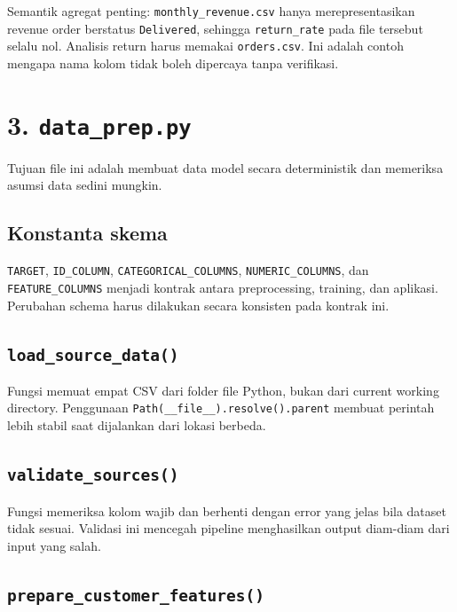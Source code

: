 \documentclass[
  indonesian,
  letterpaper,
  DIV=11,
  numbers=noendperiod]{scrreprt}
\begin{document}
Semantik agregat penting: \texttt{monthly\_revenue.csv} hanya
merepresentasikan revenue order berstatus \texttt{Delivered}, sehingga
\texttt{return\_rate} pada file tersebut selalu nol. Analisis return
harus memakai \texttt{orders.csv}. Ini adalah contoh mengapa nama kolom
tidak boleh dipercaya tanpa verifikasi.

\section{\texorpdfstring{3.
\texttt{data\_prep.py}}{3. data\_prep.py}}\label{data_prep.py}

Tujuan file ini adalah membuat data model secara deterministik dan
memeriksa asumsi data sedini mungkin.

\subsection{Konstanta skema}\label{konstanta-skema}

\texttt{TARGET}, \texttt{ID\_COLUMN}, \texttt{CATEGORICAL\_COLUMNS},
\texttt{NUMERIC\_COLUMNS}, dan \texttt{FEATURE\_COLUMNS} menjadi kontrak
antara preprocessing, training, dan aplikasi. Perubahan schema harus
dilakukan secara konsisten pada kontrak ini.

\subsection{\texorpdfstring{\texttt{load\_source\_data()}}{load\_source\_data()}}\label{load_source_data}

Fungsi memuat empat CSV dari folder file Python, bukan dari current
working directory. Penggunaan
\texttt{Path(\_\_file\_\_).resolve().parent} membuat perintah lebih
stabil saat dijalankan dari lokasi berbeda.

\subsection{\texorpdfstring{\texttt{validate\_sources()}}{validate\_sources()}}\label{validate_sources}

Fungsi memeriksa kolom wajib dan berhenti dengan error yang jelas bila
dataset tidak sesuai. Validasi ini mencegah pipeline menghasilkan output
diam-diam dari input yang salah.

\subsection{\texorpdfstring{\texttt{prepare\_customer\_features()}}{prepare\_customer\_features()}}\label{prepare_customer_features}
\end{document}
